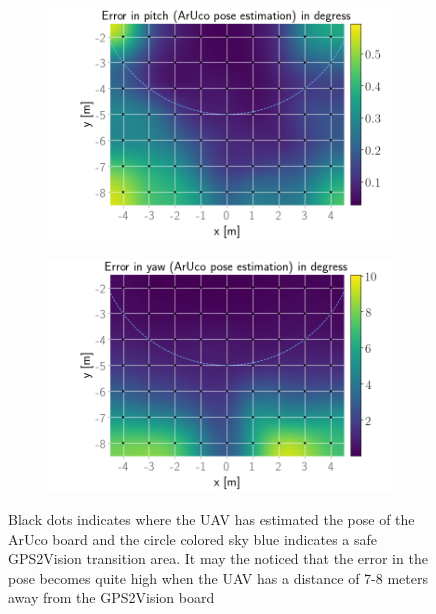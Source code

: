 \documentclass[../Head/report.tex]{subfiles}
\begin{document}
\begin{figure}[H]
    \begin{subfigure}[t]{.337\textwidth}
        \centering
        \includegraphics[width=\textwidth]{../Figures/GPS2Vision_pose_estimation_test/test1_aruco_board_width_0.2_space_0.1/aruco_pose_estimation_error_pitch.png}
        \caption{}
        \label{fig:GPS2Vision_pose_estimation_test1_error_pitch}
    \end{subfigure}
    \hspace{-0.9em}
    \begin{subfigure}[t]{.337\textwidth}
        \centering
        \includegraphics[width=\textwidth]{../Figures/GPS2Vision_pose_estimation_test/test1_aruco_board_width_0.2_space_0.1/aruco_pose_estimation_error_yaw.png}
        \caption{}
        \label{fig:GPS2Vision_pose_estimation_test1_error_yaw}
    \end{subfigure}
    \caption{Black dots indicates where the UAV has estimated the pose of the ArUco board and the circle colored sky blue indicates a safe GPS2Vision transition area. It may the noticed that the error in the pose becomes quite high when the UAV has a distance of 7-8 meters away from the GPS2Vision board}
    \label{fig:GPS2Vision_pose_estimation_test1_error_pos}
\end{figure}
\end{document}
